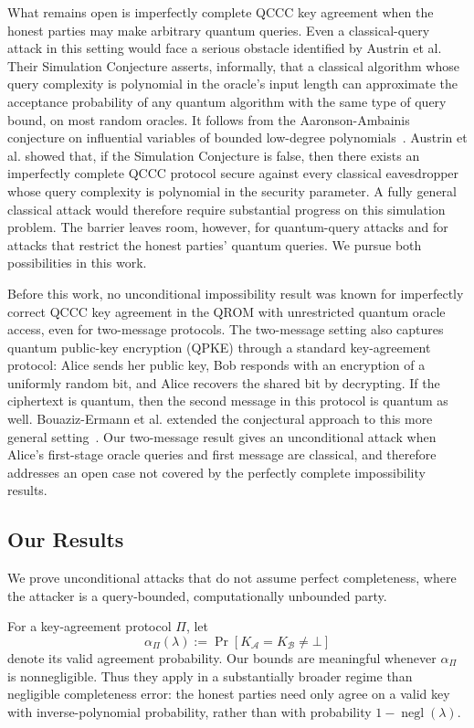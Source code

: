 \documentclass[11pt]{article}
\newcounter{algorithm}
\newcommand{\cA}{\mathcal{A}}
\newcommand{\cB}{\mathcal{B}}
\newcommand{\negl}{\operatorname{negl}}
\begin{document}
What remains open is imperfectly complete QCCC key agreement when the honest
parties may make arbitrary quantum queries. Even a classical-query attack in
this setting would face a serious obstacle identified by Austrin et al. Their
Simulation Conjecture asserts, informally, that a classical algorithm whose
query complexity is polynomial in the oracle's input length can approximate
the acceptance probability of any quantum algorithm with the same type of
query bound, on most random oracles. It follows from
the Aaronson-Ambainis conjecture on influential variables of bounded
low-degree polynomials~\cite{AaronsonAmbainis14}. Austrin et al. showed that,
if the Simulation Conjecture is false, then there exists an imperfectly complete QCCC protocol secure against
every classical eavesdropper whose query complexity is polynomial in the
security parameter. A fully general classical
attack would therefore require substantial progress on this simulation
problem. The barrier leaves room, however, for quantum-query attacks and for
attacks that restrict the honest parties' quantum queries. We pursue both
possibilities in this work.

Before this work, no unconditional impossibility result was known for
imperfectly correct QCCC key agreement in the QROM with unrestricted quantum
oracle access, even for two-message protocols.  The two-message setting also
captures quantum public-key encryption (QPKE) through a standard
key-agreement protocol: Alice sends her public key, Bob responds with an
encryption of a uniformly random bit, and Alice recovers the shared bit by
decrypting. If the ciphertext is quantum, then the second message in this protocol is
quantum as well.  Bouaziz-Ermann et al. extended the conjectural approach to
this more general setting~\cite{BouazizEtAl24}.  Our two-message result gives
an unconditional attack when Alice's first-stage oracle queries and first
message are classical, and therefore addresses an open case not covered by
the perfectly complete impossibility results.

\subsection{Our Results}

We prove unconditional attacks that do not assume perfect completeness, where the attacker is a query-bounded, computationally unbounded party. 

For a key-agreement protocol \(\Pi\), let
\[
  \alpha_\Pi(\lambda)
  :=
  \Pr[K_{\cA}=K_{\cB}\neq\bot]
\]
denote its valid agreement probability. Our bounds are meaningful whenever
\(\alpha_\Pi\) is nonnegligible.  Thus they apply in a substantially broader
regime than negligible completeness error: the honest parties need only agree
on a valid key with inverse-polynomial probability, rather than with
probability \(1-\negl(\lambda)\). 
\end{document}
